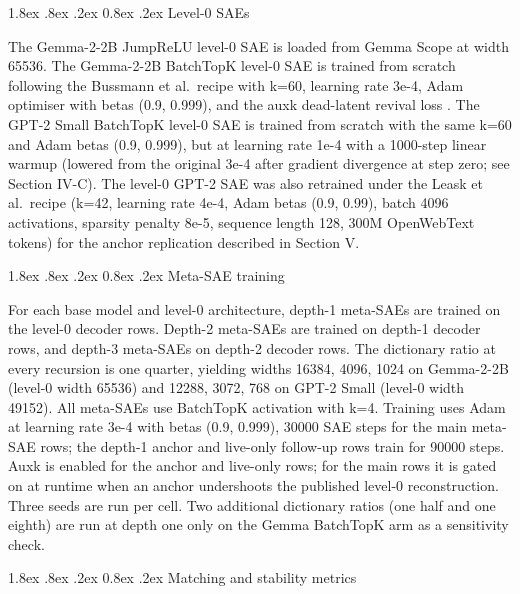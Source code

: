 \documentclass[conference]{IEEEtran}
\makeatletter
\renewcommand\subsection{\@startsection{subsection}{2}{\z@}%
   {1.8ex \@plus .8ex \@minus .2ex}%
   {0.8ex \@plus .2ex}%
   {\normalfont\large\bfseries}}
\makeatother
\begin{document}
\hypertarget{b.-level-0-saes}{%
\subsection{Level-0 SAEs}\label{b.-level-0-saes}}

The Gemma-2-2B JumpReLU level-0 SAE is loaded from Gemma Scope
\autocite{lieberum2024gemma} at width 65536. The Gemma-2-2B BatchTopK
level-0 SAE is trained from scratch following the Bussmann et al.~recipe
\autocite{bussmann2024batchtopk} with k=60, learning rate 3e-4, Adam
optimiser with betas (0.9, 0.999), and the auxk dead-latent revival loss
\autocite{bussmann2024batchtopk}. The GPT-2 Small BatchTopK level-0 SAE
is trained from scratch with the same k=60 and Adam betas (0.9, 0.999),
but at learning rate 1e-4 with a 1000-step linear warmup (lowered from
the original 3e-4 after gradient divergence at step zero; see Section
IV-C). The level-0 GPT-2 SAE was also retrained under the Leask et
al.~recipe \autocite{leask2025sparse} (k=42, learning rate 4e-4, Adam
betas (0.9, 0.99), batch 4096 activations, sparsity penalty 8e-5,
sequence length 128, 300M OpenWebText tokens) for the anchor replication
described in Section V.

\hypertarget{c.-meta-sae-training}{%
\subsection{Meta-SAE training}\label{c.-meta-sae-training}}

For each base model and level-0 architecture, depth-1 meta-SAEs are
trained on the level-0 decoder rows. Depth-2 meta-SAEs are trained on
depth-1 decoder rows, and depth-3 meta-SAEs on depth-2 decoder rows. The
dictionary ratio at every recursion is one quarter, yielding widths
16384, 4096, 1024 on Gemma-2-2B (level-0 width 65536) and 12288, 3072,
768 on GPT-2 Small (level-0 width 49152). All meta-SAEs use BatchTopK
activation with k=4. Training uses Adam at learning rate 3e-4 with betas
(0.9, 0.999), 30000 SAE steps for the main meta-SAE rows; the depth-1
anchor and live-only follow-up rows train for 90000 steps. Auxk is
enabled for the anchor and live-only rows; for the main rows it is gated
on at runtime when an anchor undershoots the published level-0
reconstruction. Three seeds are run per cell. Two additional dictionary
ratios (one half and one eighth) are run at depth one only on the Gemma
BatchTopK arm as a sensitivity check.

\hypertarget{d.-matching-and-stability-metrics}{%
\subsection{Matching and stability
metrics}\label{d.-matching-and-stability-metrics}}
\end{document}
